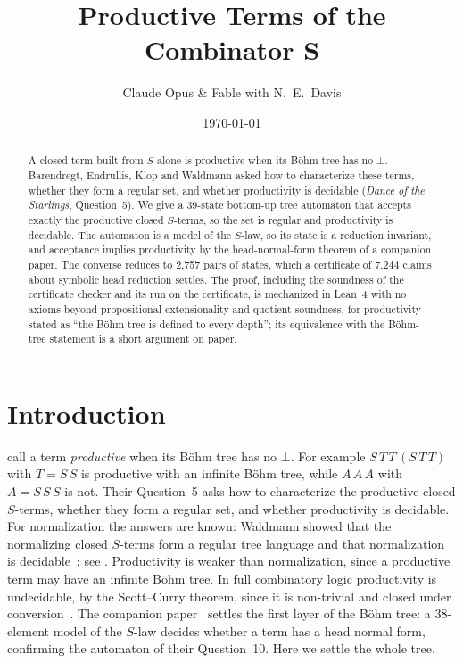 \documentclass[11pt]{amsart}
\title{Productive Terms of the Combinator $\bm{S}$}
\author{Claude Opus \& Fable with N.\ E.\ Davis}
\date{\today}
\theoremstyle{definition}
\theoremstyle{remark}
\begin{document}
\begin{abstract}
A closed term built from $S$ alone is productive when its B\"ohm tree has no $\bot$.
Barendregt, Endrullis, Klop and Waldmann asked how to characterize these terms, whether
they form a regular set, and whether productivity is decidable (\emph{Dance of the
Starlings}, Question~5). We give a 39-state bottom-up tree automaton that accepts
exactly the productive closed $S$-terms, so the set is regular and productivity is
decidable. The automaton is a model of the $S$-law, so its state is a reduction
invariant, and acceptance implies productivity by the head-normal-form theorem of a
companion paper. The converse reduces to 2,757 pairs of states, which a certificate of
7,244 claims about symbolic head reduction settles. The proof, including the soundness of
the certificate checker and its run on the certificate, is mechanized in Lean~4 with no
axioms beyond propositional extensionality and quotient soundness, for productivity stated
as ``the B\"ohm tree is defined to every depth''; its equivalence with the B\"ohm-tree
statement is a short argument on paper.
\end{abstract}

\maketitle

\section{Introduction}\label{sec:intro}

\citet{dots} call a term \emph{productive} when its B\"ohm tree has no $\bot$. For example $S\,T\,T\,(S\,T\,T)$ with $T=S\,S$ is productive
with an infinite B\"ohm tree, while $A\,A\,A$ with $A=S\,S\,S$ is not. Their
Question~5 asks how to characterize the productive closed $S$-terms, whether they form a
regular set, and whether productivity is decidable. For normalization the answers are
known: Waldmann showed that the normalizing closed $S$-terms form a regular tree language
and that normalization is decidable~\citep{waldmann-thesis,waldmann-ic}; see
\citet[Theorem~9]{dots}. Productivity is weaker than normalization, since a productive term
may have an infinite B\"ohm tree. In full combinatory logic productivity is undecidable, by
the Scott--Curry theorem, since it is non-trivial and closed under
conversion~\citep{barendregt}. The companion paper~\citep{s1}
settles the first layer of the B\"ohm tree: a 38-element model of the $S$-law decides
whether a term has a head normal form, confirming the automaton of their Question~10. Here we
settle the whole tree.
\end{document}
